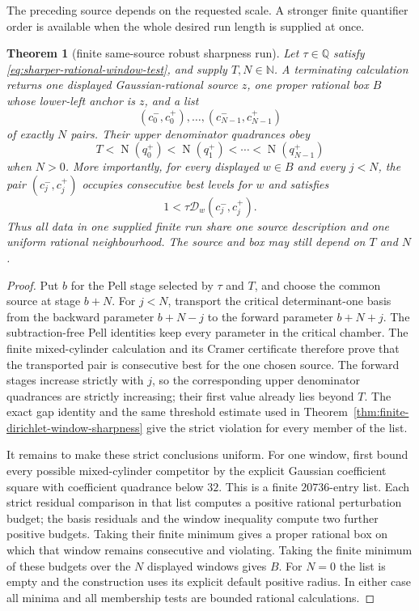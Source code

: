 \documentclass[11pt]{article}
\newtheorem{theorem}{Theorem}[section]
\newcommand{\Q}{\mathbb{Q}}
\newcommand{\N}{\mathbb{N}}
\newcommand{\Norm}[1]{\operatorname{N}\!\left(#1\right)}
\begin{document}
The preceding source depends on the requested scale.  A stronger finite
quantifier order is available when the whole desired run length is supplied
at once.

\begin{theorem}[finite same-source robust sharpness run]
\label{thm:finite-same-source-sharpness-run}
Let $\tau\in\Q$ satisfy
\eqref{eq:sharper-rational-window-test}, and supply $T,N\in\N$.  A terminating
calculation returns one displayed Gaussian-rational source $z$, one proper
rational box $B$ whose lower-left anchor is $z$, and a list
\[
  (c^-_0,c^+_0),\ldots,(c^-_{N-1},c^+_{N-1})
\]
of exactly $N$ pairs.  Their upper denominator quadrances obey
\[
 T<\Norm{q^+_0}<\Norm{q^+_1}<\cdots<\Norm{q^+_{N-1}}
\]
when $N>0$.  More importantly, for every displayed $w\in B$ and every $j<N$,
the pair
$(c^-_j,c^+_j)$ occupies consecutive best levels for $w$ and satisfies
\[
       1<\tau\mathcal D_w(c^-_j,c^+_j).
\]
Thus all data in one supplied finite run share one source description and one
uniform rational neighbourhood.  The source and box may still depend on
$T$ and $N$.
\end{theorem}

\begin{proof}
Put $b$ for the Pell stage selected by $\tau$ and $T$, and choose the common
source at stage $b+N$.  For $j<N$, transport the critical determinant-one
basis from the backward parameter $b+N-j$ to the forward parameter
$b+N+j$.  The subtraction-free Pell identities keep every parameter in the
critical chamber.  The finite mixed-cylinder calculation and its Cramer
certificate therefore prove that the transported pair is consecutive best
for the one chosen source.  The forward stages increase strictly with $j$,
so the corresponding upper denominator quadrances are strictly increasing;
their first value already lies beyond $T$.  The exact gap identity and the
same threshold estimate used in
Theorem~\ref{thm:finite-dirichlet-window-sharpness} give the strict violation
for every member of the list.

It remains to make these strict conclusions uniform.  For one window, first
bound every possible mixed-cylinder competitor by the explicit Gaussian
coefficient square with coefficient quadrance below $32$.  This is a finite
$20736$-entry list.  Each strict residual comparison in that list computes a
positive rational perturbation budget; the basis residuals and the window
inequality compute two further positive budgets.  Taking their finite minimum
gives a proper rational box on which that window remains consecutive and
violating.  Taking the finite minimum of these budgets over the $N$ displayed
windows gives $B$.  For $N=0$ the list is empty and the construction uses its
explicit default positive radius.  In either case all minima and all
membership tests are bounded rational calculations.
\end{proof}
\end{document}
